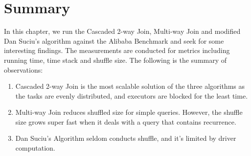 \section{Summary}
In this chapter, we run the Cascaded 2-way Join, Multi-way Join and modified Dan Suciu's algorithm against the Alibaba Benchmark and seek for some interesting findings. The measurements are conducted for metrics including running time, time stack and shuffle size. The following is the summary of observations:
\begin{enumerate}
    \item Cascaded 2-way Join is the most scalable solution of the three algorithms as the tasks are evenly distributed, and executors are blocked for the least time.
    \item Multi-way Join reduces shuffled size for simple queries. However, the shuffle size grows super fast when it deals with a query that contains recurrence.
    \item Dan Suciu's Algorithm seldom conducts shuffle, and it's limited by driver computation.
\end{enumerate}